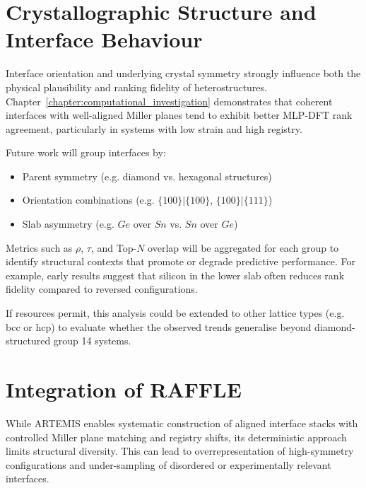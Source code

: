 \section{Crystallographic Structure and Interface Behaviour}

Interface orientation and underlying crystal symmetry strongly influence both the physical plausibility and ranking fidelity of heterostructures\cite{Davies2024-ju}.
Chapter~\ref{chapter:computational_investigation} demonstrates that coherent interfaces with well-aligned Miller planes tend to exhibit better MLP-DFT rank agreement, particularly in systems with low strain and high registry.

Future work will group interfaces by:

\begin{itemize}
    \item Parent symmetry (e.g. diamond vs. hexagonal structures)
    \item Orientation combinations (e.g. $\{100\}|\{100\}$, $\{100\}|\{111\}$)
    \item Slab asymmetry (e.g. $Ge$ over $Sn$ vs. $Sn$ over $Ge$)
\end{itemize}

Metrics such as $\rho$, $\tau$, and Top-$N$ overlap will be aggregated for each group to identify structural contexts that promote or degrade predictive performance.
For example, early results suggest that silicon in the lower slab often reduces rank fidelity compared to reversed configurations.

If resources permit, this analysis could be extended to other lattice types (e.g. bcc or hcp) to evaluate whether the observed trends generalise beyond diamond-structured group 14 systems.

\section{Integration of RAFFLE}

While ARTEMIS enables systematic construction of aligned interface stacks with controlled Miller plane matching and registry shifts, its deterministic approach limits structural diversity.
This can lead to overrepresentation of high-symmetry configurations and under-sampling of disordered or experimentally relevant interfaces\cite{artemis_paper}.

